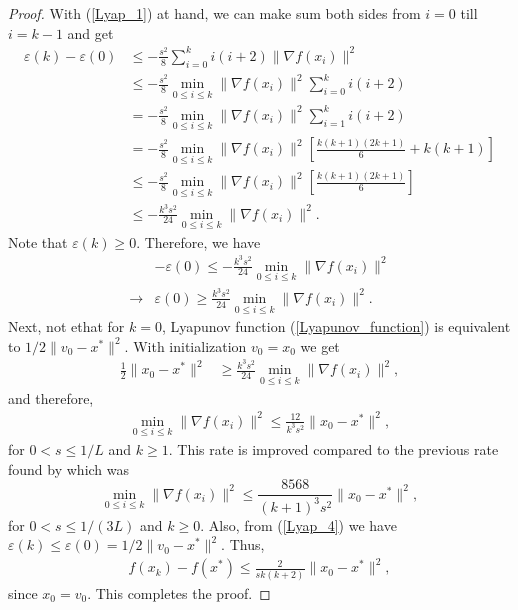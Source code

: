 \documentclass{article}
\theoremstyle{plain}
\theoremstyle{definition}
\theoremstyle{remark}
\begin{document}
\begin{proof}
With (\ref{Lyap_1}) at hand, we can make sum both sides from $i=0$ till $i=k-1$ and get
\begin{align}\label{Lyap_4}
        \varepsilon(k)-\varepsilon(0)&\leq -\frac{s^2}{8}\sum_{i=0}^{k} i(i+2)\|\nabla f(x_i)\|^2\nonumber\\
        & \leq -\frac{s^2}{8}\min_{0\leq i\leq k}\|\nabla f(x_i)\|^2\sum_{i=0}^{k} i(i+2)\nonumber\\
        &=-\frac{s^2}{8}\min_{0\leq i\leq k}\|\nabla f(x_i)\|^2\sum_{i=1}^{k} i(i+2)\nonumber\\
        &=-\frac{s^2}{8}\min_{0\leq i\leq k}\|\nabla f(x_i)\|^2\left[ \frac{k(k+1)(2k+1)}{6}+k(k+1) \right]\nonumber\\
        &\leq -\frac{s^2}{8}\min_{0\leq i\leq k}\|\nabla f(x_i)\|^2\left[ \frac{k(k+1)(2k+1)}{6}\right]\nonumber\\
        &\leq -\frac{k^3s^2}{24}\min_{0\leq i\leq k}\|\nabla f(x_i)\|^2.
\end{align}
Note that $\varepsilon(k)\geq 0$. Therefore, we have
\begin{align}\label{Lyap_5}
   & -\varepsilon(0) \leq -\frac{k^3s^2}{24}\min_{0\leq i\leq k}\|\nabla f(x_i)\|^2\nonumber\\
    \rightarrow & \varepsilon(0)\geq \frac{k^3s^2}{24}\min_{0\leq i\leq k}\|\nabla f(x_i)\|^2.
\end{align}
Next, not ethat for $k=0$, Lyapunov function (\ref{Lyapunov_function}) is equivalent to $1/2\|v_0-x^*\|^2$. With initialization $v_0=x_0$ we get
\begin{align}\label{Lyap_6}
    \frac{1}{2}\|x_0-x^*\|^2&\geq \frac{k^3s^2}{24}\min_{0\leq i\leq k}\|\nabla f(x_i)\|^2,
\end{align}
and therefore,
\begin{align}\label{Lyap_7}
    \min_{0\leq i\leq k}\|\nabla f(x_i)\|^2 \leq \frac{12}{k^3s^2}\|x_0-x^*\|^2,
\end{align}
for $0< s\leq 1/L$ and $k\geq 1$. This rate is improved compared to the previous rate found by \cite{Shi2021UnderstandingTA} which was 
$$ \min_{0\leq i\leq k}\|\nabla f(x_i)\|^2 \leq \frac{8568}{(k+1)^3s^2}\|x_0-x^*\|^2,$$
for $0< s\leq 1/(3L)$ and $k\geq0$.
Also, from (\ref{Lyap_4}) we have $\varepsilon(k)\leq \varepsilon(0) = 1/2\|v_0-x^*\|^2$. Thus,
\begin{align}\label{Lyap_8}
    f(x_k)-f(x^*)\leq \frac{2}{sk(k+2)}\|x_0-x^*\|^2,
\end{align}
since $x_0=v_0$. This completes the proof.
\end{proof}
\end{document}
